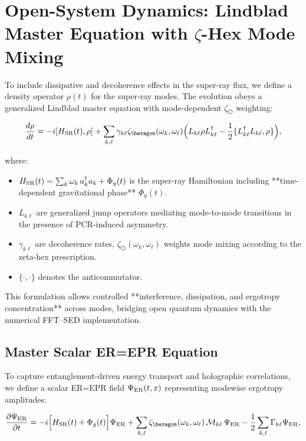 \section{Open-System Dynamics: Lindblad Master Equation with $\zeta$-Hex Mode Mixing}

To include dissipative and decoherence effects in the super-ray flux, we define a density operator $\rho(t)$ for the super-ray modes. 
The evolution obeys a generalized Lindblad master equation with mode-dependent $\zeta_{\hexagon}$ weighting:

\begin{equation}
\frac{d\rho}{dt} = -i [H_{\rm SR}(t) , \rho] 
+ \sum_{k,\ell} \gamma_{k\ell} \zeta_{\hexagon}(\omega_k,\omega_\ell) 
\Big( L_{k\ell} \rho L_{k\ell}^\dagger - \frac{1}{2}\{L_{k\ell}^\dagger L_{k\ell}, \rho\} \Big),
\end{equation}

where:

\begin{itemize}
\item $H_{\rm SR}(t) = \sum_k \omega_k \, a_k^\dagger a_k + \Phi_g(t)$ is the super-ray Hamiltonian including **time-dependent gravitational phase** $\Phi_g(t)$.
\item $L_{k\ell}$ are generalized jump operators mediating mode-to-mode transitions in the presence of PCR-induced asymmetry.
\item $\gamma_{k\ell}$ are decoherence rates, $\zeta_{\hexagon}(\omega_k,\omega_\ell)$ weights mode mixing according to the zeta-hex prescription.
\item $\{ \cdot , \cdot \}$ denotes the anticommutator.
\end{itemize}

This formulation allows controlled **interference, dissipation, and ergotropy concentration** across modes, bridging open quantum dynamics with the numerical FFT–SED implementation.

\subsection{Master Scalar ER=EPR Equation}

To capture entanglement-driven energy transport and holographic correlations, we define a scalar ER=EPR field $\Psi_{\rm ER}(t,x)$ representing modewise ergotropy amplitudes:

\begin{equation}
\frac{\partial \Psi_{\rm ER}}{\partial t} 
= -i \Big[ H_{\rm SR}(t) + \Phi_g(t) \Big] \Psi_{\rm ER} 
+ \sum_{k,\ell} \zeta_{\hexagon}(\omega_k,\omega_\ell)\, \mathcal{M}_{k\ell}\, \Psi_{\rm ER} 
- \frac{1}{2} \sum_{k,\ell} \Gamma_{k\ell} \Psi_{\rm ER},
\end{equation}

